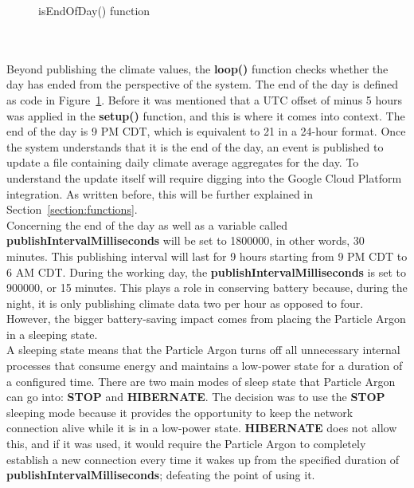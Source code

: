 \documentclass{article}
\begin{document}
\begin{minipage}[c]{\textwidth}
    \begin{figure}[H]
        
        \caption{isEndOfDay() function}
        \label{fig:endofday}
    \end{figure}
\end{minipage}\ \\\\

Beyond publishing the climate values, the \textbf{loop()} function checks whether the day has ended from the perspective of the system. The end of the day is defined as code in Figure~\ref{fig:endofday}. Before it was mentioned that a UTC offset of minus 5 hours was applied in the \textbf{setup()} function, and this is where it comes into context. The end of the day is 9 PM CDT, which is equivalent to 21 in a 24-hour format. Once the system understands that it is the end of the day, an event is published to update a file containing daily climate average aggregates for the day. To understand the update itself will require digging into the Google Cloud Platform integration. As written before, this will be further explained in Section~\ref{section:functions}.\\

Concerning the end of the day as well as a variable called \textbf{publishIntervalMilliseconds} will be set to 1800000, in other words, 30 minutes. This publishing interval will last for 9 hours starting from 9 PM CDT to 6 AM CDT. During the working day, the \textbf{publishIntervalMilliseconds} is set to 900000, or 15 minutes. This plays a role in conserving battery because, during the night, it is only publishing climate data two per hour as opposed to four. However, the bigger battery-saving impact comes from placing the Particle Argon in a sleeping state.\\

A sleeping state means that the Particle Argon turns off all unnecessary internal processes that consume energy and maintains a low-power state for a duration of a configured time. There are two main modes of sleep state that Particle Argon can go into: \textbf{STOP} and \textbf{HIBERNATE}. The decision was to use the \textbf{STOP} sleeping mode because it provides the opportunity to keep the network connection alive while it is in a low-power state. \textbf{HIBERNATE} does not allow this, and if it was used, it would require the Particle Argon to completely establish a new connection every time it wakes up from the specified duration of \textbf{publishIntervalMilliseconds}; defeating the point of using it.
\end{document}
